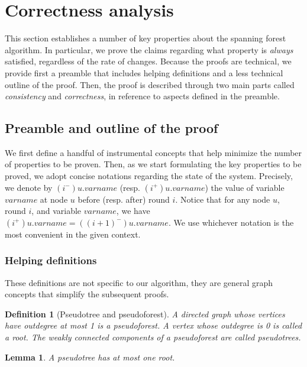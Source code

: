 \documentclass[twocolumn]{article}
\newtheorem{definition}{Definition}
\newtheorem{lemma}{Lemma}
\newcommand{\state}[3]{\ensuremath{(#2^{#3})#1}}
\newcommand{\uim}{\state{u}{i}{-}}
\newcommand{\uip}{\state{u}{i}{+}}
\newcommand{\uipm}{\state{u}{(i+1)}{-}}
\begin{document}
\section{Correctness analysis}
\label{sec:correctness}

This section establishes a number of key properties about the spanning forest algorithm. In particular, we prove the claims regarding what property is {\em always} satisfied, regardless of the rate of changes. Because the proofs are technical, we provide first a preamble that includes helping definitions and a less technical outline of the proof. Then, the proof is described through two main parts called {\em consistency} and {\em correctness}, in reference to aspects defined in the preamble.

\subsection{Preamble and outline of the proof}
We first define a handful of instrumental concepts that help minimize the number of properties to be proven. Then, as we start formulating the key properties to be proved, we adopt concise notations regarding the state of the system. Precisely, we denote by $\uim.varname$ (resp. $\uip.varname$) the value of variable $varname$ at node $u$ before (resp. after) 
round $i$. Notice that for any node $u$, round $i$, and variable $varname$, we have $\uip.varname=\uipm.varname$. 
We use whichever notation is the most convenient in the given context.

\subsubsection{Helping definitions}

These definitions are not specific to our algorithm, they are general graph concepts that simplify the subsequent proofs.

\begin{definition}[Pseudotree and pseudoforest]
\label{def:pseudoforest}
A directed graph whose vertices have outdegree at most 1 is a {\em pseudoforest}.
A vertex whose outdegree is 0 is called a {\em root}.
The weakly connected components of a pseudoforest are called {\em pseudotrees}.
\end{definition}


\begin{lemma}
\label{lem:one_root}
  A pseudotree has at most one root.
\end{lemma}
\end{document}
